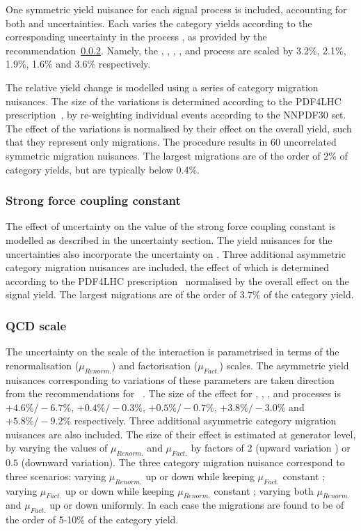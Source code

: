 One symmetric yield nuisance for each signal process is included, accounting for both \PDF and \alphaS uncertainties. Each varies the category yields according to the corresponding uncertainty in the process \crosssection, as provided by the \LHCHXSWG recommendation~\ref{}. Namely, the \ggH, \VBF, \WH, \ZH, and \ttH process \crosssection\s are scaled by 3.2\%, 2.1\%, 1.9\%, 1.6\% and 3.6\% respectively. 

The relative yield change is modelled using a series of category migration nuisances. The size of the variations is determined according to the PDF4LHC prescription~\cite{}, by re-weighting individual events according to the NNPDF30 \PDF set. The effect of the variations is normalised by their effect on the overall yield, such that they represent only migrations. The procedure results in 60 uncorrelated symmetric migration nuisances. The largest migrations are of the order of 2\% of category yields, but are typically below 0.4\%.

\subsubsection{Strong force coupling constant}

The effect of uncertainty on the value of the strong force coupling constant \alphaS is modelled as described in the \PDF uncertainty section. The yield nuisances for the \PDF uncertainties also incorporate the uncertainty on \alphaS. Three additional asymmetric category migration nuisances are included, the effect of which is determined according to the PDF4LHC prescription~\cite{} normalised by the overall effect on the signal yield. The largest migrations are of the order of $3.7\%$ of the category yield. 

\subsubsection{QCD scale}
The uncertainty on the scale of the \QCD interaction is parametrised in terms of the renormalisation ($\mu_{Renorm.}$) and factorisation ($\mu_{Fact.}$) scales. The asymmetric yield nuisances corresponding to variations of these parameters are taken direction from the \LHCHXSWG recommendations for \crosssection\s~\cite{}. The size of the effect for \ggH, \VBF, \WH, \ZH and \ttH processes is $+4.6\%/-6.7\%$, $+0.4\%/-0.3\%$, $+0.5\%/-0.7\%$, $+3.8\%/-3.0\%$ and $+5.8\%/-9.2\%$ respectively. Three additional asymmetric category migration nuisances are also included. The size of their effect is estimated at generator level, by varying the values of $\mu_{Renorm.}$ and $\mu_{Fact.}$ by factors of $2$ (upward variation ) or $0.5$ (downward variation). The three category migration nuisance correspond to three scenarios: varying $\mu_{Renorm.}$ up or down while keeping $\mu_{Fact.}$ constant ; varying $\mu_{Fact.}$ up or down while keeping $\mu_{Renorm.}$ constant ; varying both $\mu_{Renorm.}$ and $\mu_{Fact.}$ up or down uniformly. In each case the migrations are found to be of the order of 5-10\% of the category yield.

